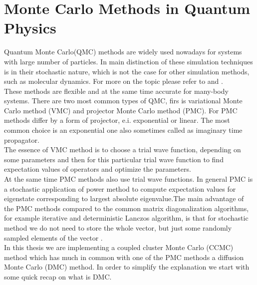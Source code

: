 \documentclass[twoside,english]{uiofysmaster}
\theoremstyle{definition}
\begin{document}
\chapter{Monte Carlo Methods in Quantum Physics}\label{ch:MCalgo}
Quantum Monte Carlo(QMC) methods are widely used nowadays for systems with large number of particles. In main distinction of these simulation techniques is in their stochastic nature, which is not the case for other simulation methods, such as molecular dynamics. For more on the topic please refer to \cite{hammondMonteCarloMethods1994} and \cite{kalosMonteCarloMethods2008}. \\
These methods are flexible and at the same time accurate for many-body systems. There are two most common types of QMC, firs is variational Monte Carlo method (VMC) and projector Monte Carlo method (PMC). For PMC methods differ by a form of projector, e.i. exponential or linear. The most common choice is an exponential one also sometimes called as imaginary time propagator.\\
The essence of VMC method is to choose a trial wave function, depending on some parameters and then for this particular trial wave function to find expectation values of operators and optimize the parameters.\\
At the same time PMC methods also use trial wave functions. In general PMC is a stochastic application of power method to compute expectation values for eigenstate corresponding to largest absolute eigenvalue.The main advantage of the PMC methods compared to the common matrix diagonalization algorithms, for example iterative and deterministic Lanczos algorithm, is that for stochastic method we do not need to store the whole vector, but just some randomly sampled elements of the vector \cite{umrigarObservationsVariationalProjector2015}. \\
In this thesis we are implementing a coupled cluster Monte Carlo (CCMC) method which has much in common with one of the PMC methods a diffusion Monte Carlo (DMC) method. In order to simplify the explanation we start with some quick recap on what is DMC.\\
\end{document}
